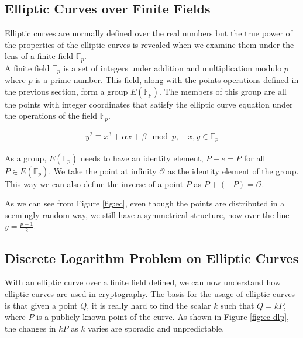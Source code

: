 \subsection{Elliptic Curves over Finite Fields}

Elliptic curves are normally defined over the real numbers but the true power of the properties of the elliptic curves is revealed when we examine them under the lens of a finite field $\mathbb{F}_p$.
\\

A finite field $\mathbb{F}_p$ is a set of integers under addition and multiplication modulo $p$ where $p$ is a prime number. This field, along with the points operations defined in the previous section, form a group $E(\mathbb{F}_p)$. The members of this group are all the points with integer coordinates that satisfy the elliptic curve equation under the operations of the field $\mathbb{F}_p$.

\begin{gather}
    y^2 \equiv x^3 + \alpha x + \beta \mod p, \quad x, y \in \mathbb{F}_p
\end{gather}

As a group, $E(\mathbb{F}_p)$ needs to have an identity element, $P + e = P$ for all $P \in E(\mathbb{F}_p)$. We take the point at infinity $\mathcal{O}$ as the identity element of the group. This way we can also define the inverse of a point $P$ as $P + (-P) = \mathcal{O}$.


As we can see from Figure \ref{fig:ec}, even though the points are distributed in a seemingly random way, we still have a symmetrical structure, now over the line $y = \frac{p - 1}{2}$.

\subsection{Discrete Logarithm Problem on Elliptic Curves}
With an elliptic curve over a finite field defined, we can now understand how elliptic curves are used in cryptography. The basis for the usage of elliptic curves is that given a point $Q$, it is really hard to find the scalar $k$ such that $Q = kP$, where $P$ is a publicly known point of the curve. As shown in Figure \ref{fig:ec-dlp}, the changes in $kP$ as $k$ varies are sporadic and unpredictable.



